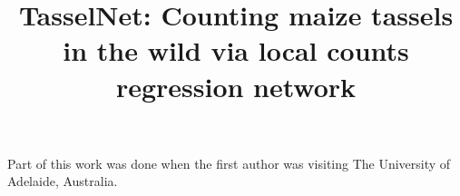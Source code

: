 \documentclass[twocolumn]{bmcart}%
\begin{document}
%
\begin{frontmatter}

\begin{fmbox}

%
%
%
%
%

\title{TasselNet: Counting maize tassels in the wild via local counts regression network
}



\author[
   addressref={aff1},                   %
   email={poppinace@hust.edu.cn}        %
]{ }
\author[
   addressref={aff1},
   corref={aff1},                       %
   email={zgcao@hust.edu.cn}
]{ }
\author[
addressref={aff1},
email={Yang\_Xiao@hust.edu.cn}
]{ }
\author[
addressref={aff2},
email={bohan.zhuang@adelaide.edu.au}
]{ }
\author[
addressref={aff2},
email={chunhua.shen@adelaide.edu.au}
]{ }




%
%
%
%
%
%
%
%

\address[id=aff1]{%
  , %
  ,                               %
  ,                          %
}
\address[id=aff2]{%
  ,
  ,
  ,
}

%
%
%
%
%
%
%
%

\begin{artnotes}{Part of this work was done when
the first author was visiting The University of Adelaide, Australia.}
%
\end{artnotes}




%

%
%
%
%
%
%
%
%
%
%

\begin{abstractbox}

\begin{abstract} %


\end{abstract}
\end{abstractbox}
\end{fmbox}
\end{frontmatter}
\end{document}
